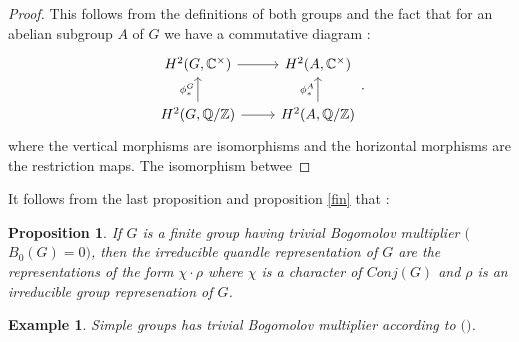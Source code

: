 \documentclass[12pt, reqno]{amsart}
\newtheorem{proposition}[theorem]{Proposition}
\newtheorem{example}[theorem]{Example}
\begin{document}
\begin{proof}
This follows from the definitions of both groups and the fact that for an abelian subgroup $A$ of $G$ we have a commutative diagram : 
$$\begin{tikzcd}
H^2(G,\mathbb{C}^\times) \arrow{r} & H^2(A,\mathbb{C}^\times)  \\ 
 H^2(G, \mathbb{Q}/\mathbb{Z})\arrow{u}{\phi_*^G} \arrow{r}&   H^2(A, \mathbb{Q}/\mathbb{Z})\arrow{u}{\phi_*^A}
\end{tikzcd} .$$
where the vertical morphisms are isomorphisms and the horizontal morphisms are the restriction maps. The isomorphism betwee
\end{proof}
It follows from the last proposition and proposition \ref{fin} that :
\begin{proposition}
If $G$ is a finite group having trivial Bogomolov multiplier $($$B_0(G)=0$$)$, then the irreducible quandle representation of $G$ are the representations of the form $\chi\cdot \rho$ where $\chi$ is a character of $Conj(G)$ and $\rho$ is an irreducible group represenation of $G$. 
\end{proposition}
\begin{example}
Simple groups has trivial Bogomolov multiplier according to $($\cite{Bog}$)$.
\end{example}
\end{document}
